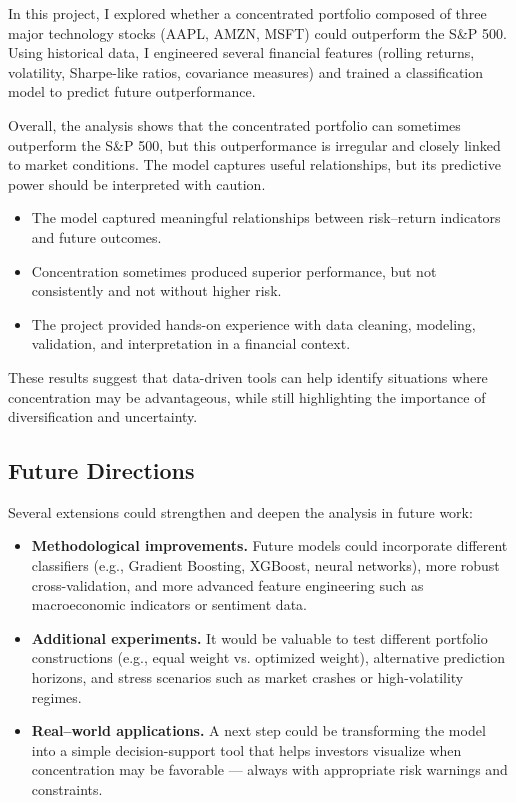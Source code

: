 \documentclass[11pt,a4paper]{article}
\begin{document}
In this project, I explored whether a concentrated portfolio composed of three major technology stocks (AAPL, AMZN, MSFT) could outperform the S\&P 500. Using historical data, I engineered several financial features (rolling returns, volatility, Sharpe-like ratios, covariance measures) and trained a classification model to predict future outperformance.

Overall, the analysis shows that the concentrated portfolio can sometimes outperform the S&P 500, but this outperformance is irregular and closely linked to market conditions. The model captures useful relationships, but its predictive power should be interpreted with caution.

\begin{itemize}
\item The model captured meaningful relationships between risk–return indicators and future outcomes.
\item Concentration sometimes produced superior performance, but not consistently and not without higher risk.
\item The project provided hands-on experience with data cleaning, modeling, validation, and interpretation in a financial context.
\end{itemize}

These results suggest that data-driven tools can help identify situations where concentration may be advantageous, while still highlighting the importance of diversification and uncertainty.

\subsection{Future Directions}

Several extensions could strengthen and deepen the analysis in future work:

\begin{itemize}

\item \textbf{Methodological improvements.}
Future models could incorporate different classifiers (e.g., Gradient Boosting, XGBoost, neural networks), more robust cross-validation, and more advanced feature engineering such as macroeconomic indicators or sentiment data.

\item \textbf{Additional experiments.}
It would be valuable to test different portfolio constructions (e.g., equal weight vs. optimized weight), alternative prediction horizons, and stress scenarios such as market crashes or high-volatility regimes.

\item \textbf{Real–world applications.}
A next step could be transforming the model into a simple decision-support tool that helps investors visualize when concentration may be favorable — always with appropriate risk warnings and constraints.

\end{itemize}
\end{document}
